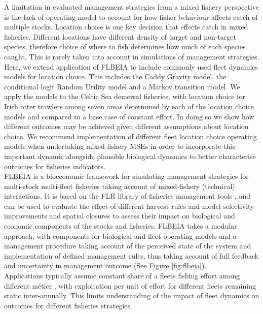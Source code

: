 \documentclass[12pt, halfline, a4paper]{ouparticle}
\begin{document}
A limitation in evaluated management strategies from a mixed fishery
perspective is the lack of operating model to account for how fisher behaviour
affects catch of multiple stocks. Location choice is one key decision that
effects catch in mixed fisheries. Different locations have different density of
target and non-target species, therefore choice of where to fish determines how
much of each species caught. This is rarely taken into account in simulations
of management strategies.\\

Here, we extend application of FLBEIA to include commonly used fleet dynamics
models for location choice. This includes the Caddy Gravity model, the
conditional logit Random Utility model and a Markov transition model. We apply
the models to the Celtic Sea demersal fisheries, with location choice for Irish
otter trawlers among seven areas determined by each of the location choice
models and compared to a base case of constant effort. In doing so we show how
different outcomes may be achieved given different assumptions about location
choice. We recommend implementation of different fleet location choice
operating models when undertaking mixed-fishery MSEs in order to incorporate
this important dynamic alongside plausible biological dynamics to better
characterise outcomes for fisheries indicators. \\

FLBEIA \citep{Garcia2017} is a bioeconomic framework for simulating management
strategies for multi-stock multi-fleet fisheries taking account of
mixed-fishery (technical) interactions. It is based on the FLR library of
fisheries management tools \citep{Kell2007}, and can be used to evaluate the
effect of different harvest rules and model selectivity improvements and
spatial closures to assess their impact on biological and economic components
of the stocks and fisheries.  FLBEIA takes a modular approach, with components
for biological and fleet operating models and a management procedure taking
account of the perceived state of the system and implementation of defined
management rules, thus taking account of full feedback and uncertainty in
management outcome (See Figure \ref{fig:flbeia}). \\

Applications typically assume constant share of a fleets fishing effort among
different métier \citep{Ulrich2016, Garcia2020}, with exploitation per unit of
effort for different fleets remaining static inter-annually. This limits
understanding of the impact of fleet dynamics on outcomes for different
fisheries strategies. 
\end{document}
